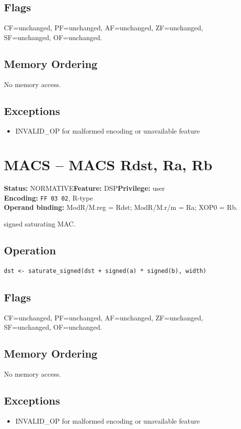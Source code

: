 \documentclass[10pt]{article}
\begin{document}
\subsection*{Flags}
CF=unchanged, PF=unchanged, AF=unchanged, ZF=unchanged, SF=unchanged, OF=unchanged.
\subsection*{Memory Ordering}
No memory access.
\subsection*{Exceptions}
\begin{itemize}
\item INVALID\_OP for malformed encoding or unavailable feature
\end{itemize}
\clearpage

\section{MACS -- MACS Rdst, Ra, Rb}
\textbf{Status:} NORMATIVE\quad \textbf{Feature:} DSP\quad \textbf{Privilege:} user\\
\textbf{Encoding:} \texttt{FF 03 02}, R-type\\
\textbf{Operand binding:} ModR/M.reg = Rdst; ModR/M.r/m = Ra; XOP0 = Rb.

signed saturating MAC.

\subsection*{Operation}
\begin{lstlisting}
dst <- saturate_signed(dst + signed(a) * signed(b), width)
\end{lstlisting}
\subsection*{Flags}
CF=unchanged, PF=unchanged, AF=unchanged, ZF=unchanged, SF=unchanged, OF=unchanged.
\subsection*{Memory Ordering}
No memory access.
\subsection*{Exceptions}
\begin{itemize}
\item INVALID\_OP for malformed encoding or unavailable feature
\end{itemize}
\clearpage
\end{document}
